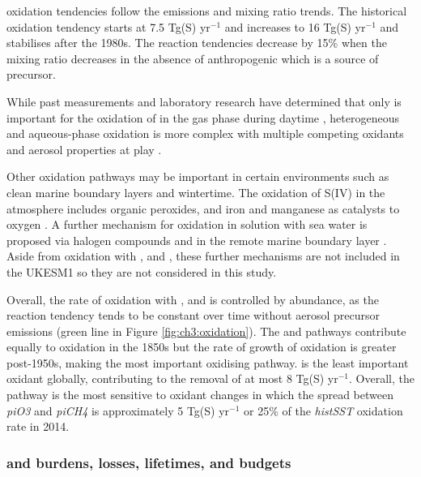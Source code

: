  oxidation tendencies follow the  emissions and  mixing ratio trends. The historical oxidation tendency starts at 7.5 Tg(S) yr$^{-1}$ and increases to 16 Tg(S) yr$^{-1}$ and stabilises after the 1980s. The  reaction tendencies decrease by 15\% when the  mixing ratio decreases in the absence of anthropogenic  which is a source of  precursor. 


While past measurements and laboratory research have determined that only  is important for the oxidation of  in the gas phase during daytime \citep[][and reference therein]{rattiganUptakeGasphaseSO22000, eatoughConversionSO2Sulfate1994}, heterogeneous and aqueous-phase oxidation is more complex with multiple competing oxidants and aerosol properties at play \citep{pattantyusReviewSulfurDioxide2018, seinfeldAtmosphericChemistryPhysics2016}. 

Other  oxidation pathways may be important in certain environments such as clean marine boundary layers and wintertime. The oxidation of S(IV) in the atmosphere includes organic peroxides, and iron and manganese as catalysts to oxygen \citet{alexanderTransitionMetalcatalyzedOxidation2009, seinfeldAtmosphericChemistryPhysics2016}. A further mechanism for  oxidation in solution with sea water is proposed via halogen compounds  and  in the remote marine boundary layer \citep{vogtMechanismHalogenRelease1996}. Aside from oxidation with ,  and , these further mechanisms are not included in the UKESM1 so they are not considered in this study. 


Overall, the rate of  oxidation with ,  and  is controlled by  abundance, as the reaction tendency tends to be constant over time without aerosol precursor emissions (green line in Figure \ref{fig:ch3:oxidation}). The  and  pathways contribute equally to  oxidation in the 1850s but the rate of growth of  oxidation is greater post-1950s, making  the most important oxidising pathway.  is the least important oxidant globally, contributing to the removal of at most 8 Tg(S) yr$^{-1}$. Overall, the  pathway is the most sensitive to oxidant changes in which the spread between \textit{piO3} and \textit{piCH4} is approximately 5 Tg(S) yr$^{-1}$ or 25\% of the \textit{histSST} oxidation rate in 2014.



\subsubsection{ and  burdens, losses, lifetimes, and budgets}

